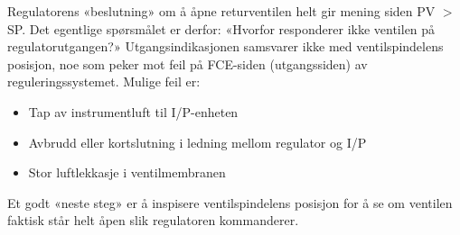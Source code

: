 





Regulatorens «beslutning» om å åpne returventilen helt gir mening siden PV $>$ SP. Det egentlige spørsmålet er derfor: «Hvorfor responderer ikke ventilen på regulatorutgangen?» Utgangsindikasjonen samsvarer ikke med ventilspindelens posisjon, noe som peker mot feil på FCE-siden (utgangssiden) av reguleringssystemet. Mulige feil er:

\begin{itemize}
\item{} Tap av instrumentluft til I/P-enheten
\item{} Avbrudd eller kortslutning i ledning mellom regulator og I/P
\item{} Stor luftlekkasje i ventilmembranen
\end{itemize}

Et godt «neste steg» er å inspisere ventilspindelens posisjon for å se om ventilen faktisk står helt åpen slik regulatoren kommanderer.


